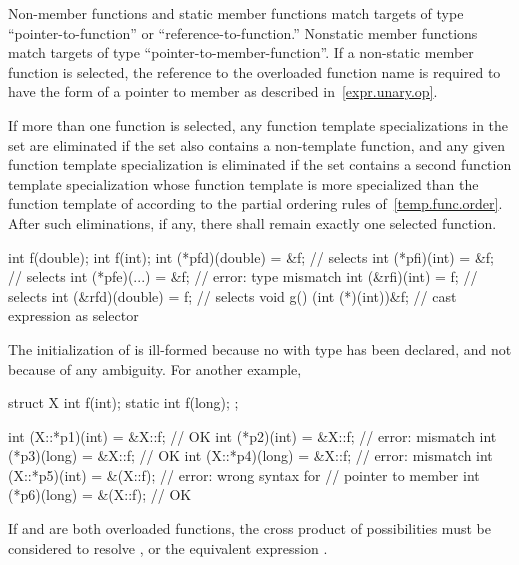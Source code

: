 \pnum
Non-member functions and static member functions
match targets of type ``pointer-to-function'' or
``reference-to-function.''
Nonstatic member functions match targets of
type ``pointer-to-member-function''.
If a non-static member function is selected, the reference to the overloaded
function name is required to have the form of a pointer to member as
described in~\ref{expr.unary.op}.

\pnum
If more than one function is selected, any
function template specializations
in the set
are eliminated if the set also contains a non-template function, and
any given
function template specialization
is eliminated if the set contains a second
function template specialization whose function template
is more specialized than the
function template of
according to
the partial ordering rules of~\ref{temp.func.order}.
After such eliminations,
if any, there shall remain exactly one selected function.

\pnum
\enterexample
\begin{codeblock}
int f(double);
int f(int);
int (*pfd)(double) = &f;        // selects 
int (*pfi)(int) = &f;           // selects 
int (*pfe)(...) = &f;           // error: type mismatch
int (&rfi)(int) = f;            // selects 
int (&rfd)(double) = f;         // selects 
void g() {
  (int (*)(int))&f;             // cast expression as selector
}
\end{codeblock}

The initialization of
is ill-formed because no
with type
has been declared, and not because of any ambiguity.
For another example,

\begin{codeblock}
struct X {
  int f(int);
  static int f(long);
};

int (X::*p1)(int)  = &X::f;     // OK
int    (*p2)(int)  = &X::f;     // error: mismatch
int    (*p3)(long) = &X::f;     // OK
int (X::*p4)(long) = &X::f;     // error: mismatch
int (X::*p5)(int)  = &(X::f);   // error: wrong syntax for
                                // pointer to member
int    (*p6)(long) = &(X::f);   // OK
\end{codeblock}
\exitexample

\pnum
\enternote
If
and
are both overloaded functions, the
cross product of possibilities must be considered
to resolve
,
or the equivalent expression
.
\exitnote

